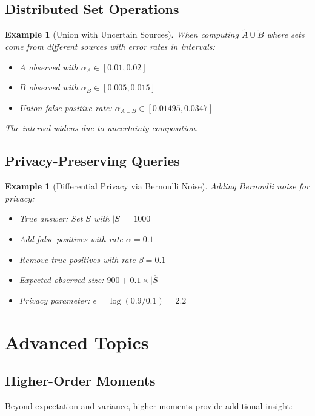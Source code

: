 \documentclass[11pt,final,hidelinks]{article}
\newtheorem{example}[theorem]{Example}
\newcommand{\obs}[1]{\widetilde{#1}}  %
\newcommand{\SetComplement}[1]{\overline{#1}}
\newcommand{\Card}[1]{\lvert#1\rvert}
\newcommand{\fprate}{\alpha}
\newcommand{\fnrate}{\beta}
\begin{document}
\subsection{Distributed Set Operations}

\begin{example}[Union with Uncertain Sources]
When computing $\obs{A} \cup \obs{B}$ where sets come from different sources with error rates in intervals:
\begin{itemize}
    \item $A$ observed with $\fprate_A \in [0.01, 0.02]$
    \item $B$ observed with $\fprate_B \in [0.005, 0.015]$
    \item Union false positive rate: $\fprate_{A \cup B} \in [0.01495, 0.0347]$
\end{itemize}
The interval widens due to uncertainty composition.
\end{example}

\subsection{Privacy-Preserving Queries}

\begin{example}[Differential Privacy via Bernoulli Noise]
Adding Bernoulli noise for privacy:
\begin{itemize}
    \item True answer: Set $S$ with $\Card{S} = 1000$
    \item Add false positives with rate $\fprate = 0.1$
    \item Remove true positives with rate $\fnrate = 0.1$
    \item Expected observed size: $900 + 0.1 \times \Card{\SetComplement{S}}$
    \item Privacy parameter: $\epsilon = \log(0.9/0.1) = 2.2$
\end{itemize}
\end{example}

\section{Advanced Topics}

\subsection{Higher-Order Moments}

Beyond expectation and variance, higher moments provide additional insight:
\end{document}
